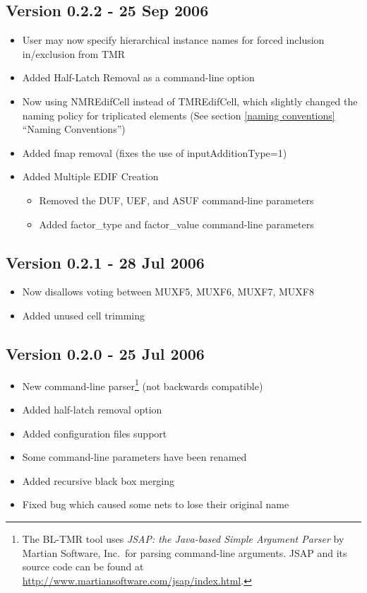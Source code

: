 \documentclass[english]{article}
\begin{document}
\subsection*{Version 0.2.2 - 25 Sep 2006}
\begin{itemize}
  \item User may now specify hierarchical instance names for forced inclusion
  in/exclusion from TMR
  \item Added Half-Latch Removal as a command-line option
  \item Now using NMREdifCell instead of TMREdifCell, which slightly changed the
  naming policy for triplicated elements (See section \ref{naming conventions}
  ``Naming Conventions'')
  \item Added fmap removal (fixes the use of inputAdditionType=1)
  \item Added Multiple EDIF Creation
  \begin{itemize}
    \item Removed the DUF, UEF, and ASUF command-line parameters
    \item Added factor\_type and factor\_value command-line parameters
  \end{itemize}
\end{itemize}

\subsection*{Version 0.2.1 - 28 Jul 2006}
\begin{itemize}
\item Now disallows voting between MUXF5, MUXF6, MUXF7, MUXF8
\item Added unused cell trimming
\end{itemize}

\subsection*{Version 0.2.0 - 25 Jul 2006}
\begin{itemize}
\item New command-line parser\footnote{The BL-TMR tool uses \emph{JSAP: the 
Java-based Simple Argument Parser} by Martian Software, Inc.\ for parsing 
command-line arguments.  JSAP and its source code can be found at 
\url{http://www.martiansoftware.com/jsap/index.html}.} (not backwards 
compatible)
\item Added half-latch removal option
\item Added configuration files support
\item Some command-line parameters have been renamed
\item Added recursive black box merging
\item Fixed bug which caused some nets to lose their original name
\end{itemize}
\end{document}
